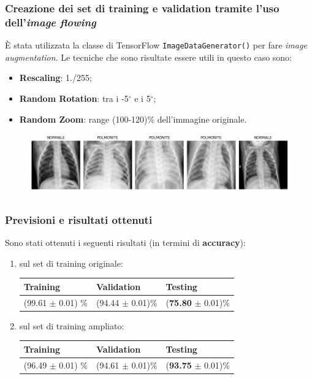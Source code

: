 \documentclass{beamer}
\begin{document}
\begin{frame}
	\frametitle{Creazione dei set di training e validation tramite l'uso dell'\emph{image flowing}}
	È stata utilizzata la classe di TensorFlow \lstinline{ImageDataGenerator()} per fare \emph{image augmentation}.
	Le tecniche che sono risultate essere utili in questo caso sono:
	\begin{itemize}
	  \item \textbf{Rescaling}: 1./255;
	  \item \textbf{Random Rotation}: tra i -5$^\circ$  e i 5$^\circ$;
	   \item \textbf{Random Zoom}: range (100-120)$\%$ dell'immagine originale.
	\end{itemize}
	\begin{figure}
		\includegraphics[width=1\textwidth]{best-augmented-images-pneumonia.png}
	\end{figure}

	
\end{frame}



\begin{frame}
	\frametitle{Previsioni e risultati ottenuti}
	Sono stati ottenuti i seguenti risultati (in termini di \textbf{accuracy}):
	\begin{enumerate}
		\item sul set di training originale:

	\begin{table}[width=0.8\textwidth]
		\begin{tabular}{lll}
		\textbf{Training} & \textbf{Validation} & \textbf{Testing} \\ \hline
		(99.61 $\pm$ 0.01) \%           & (94.44  $\pm$ 0.01)\%   &	(\textbf{75.80} $\pm$ 0.01)\%         
		\end{tabular}
		\end{table}
		\smallskip

	
				\item sul set di training ampliato:
	
	\begin{table}[width=0.8\textwidth]
		\begin{tabular}{lll}
		\textbf{Training}  & \textbf{Validation} & \textbf{Testing} \\ \hline
		(96.49 $\pm$ 0.01) \%           & (94.61  $\pm$ 0.01)\%   &	(\textbf{93.75} $\pm$ 0.01)\%         
		\end{tabular}
		\end{table}
	\end{enumerate}
	
\end{frame}
\end{document}
